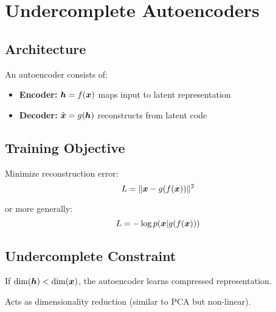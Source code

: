 
\section{Undercomplete Autoencoders }
\label{sec:undercomplete-ae}

\subsection{Architecture}

An autoencoder consists of:
\begin{itemize}
    \item \textbf{Encoder:} $\boldsymbol{h} = f(\boldsymbol{x})$ maps input to latent representation
    \item \textbf{Decoder:} $\hat{\boldsymbol{x}} = g(\boldsymbol{h})$ reconstructs from latent code
\end{itemize}

\subsection{Training Objective}

Minimize reconstruction error:
\begin{equation}
L = \|\boldsymbol{x} - g(f(\boldsymbol{x}))\|^2
\end{equation}

or more generally:
\begin{equation}
L = -\log p(\boldsymbol{x} | g(f(\boldsymbol{x})))
\end{equation}

\subsection{Undercomplete Constraint}

If $\dim(\boldsymbol{h}) < \dim(\boldsymbol{x})$, the autoencoder learns compressed representation.

Acts as dimensionality reduction (similar to PCA but non-linear).



